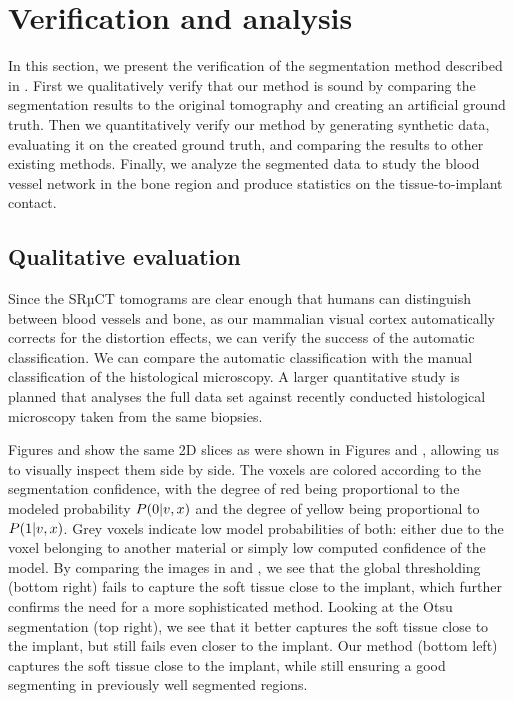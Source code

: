 \section{Verification and analysis}
\label{sec:verification}

In this section, we present the verification of the segmentation method
described in . First we qualitatively verify that our method
is sound by comparing the segmentation results to the original tomography and
creating an artificial ground truth. Then we quantitatively verify our method
by generating synthetic data, evaluating it on the created ground truth, and
comparing the results to other existing methods. Finally, we analyze the
segmented data to study the blood vessel network in the bone region and produce
statistics on the tissue-to-implant contact.

\subsection{Qualitative evaluation}

Since the SRµCT tomograms are clear enough that humans can distinguish between
blood vessels and bone, as our mammalian visual cortex automatically corrects
for the distortion effects, we can verify the success of the automatic
classification. We can compare the automatic classification with the manual
classification of the histological microscopy. A larger quantitative study is
planned that analyses the full data set against recently conducted histological
microscopy taken from the same biopsies.

Figures  and 
show the same 2D slices as were shown in Figures  and
, allowing us to visually inspect them side by side. The
voxels are colored according to the segmentation confidence, with the degree of
red being proportional to the modeled probability $P\!\left(0\middle\vert v,x\right)$ and the
degree of yellow being proportional to $P\!\left(1\middle\vert v,x\right)$. Grey voxels indicate
low model probabilities of both: either due to the voxel belonging to another
material or simply low computed confidence of the model.  By comparing the
images in  and
, we see that the global thresholding (bottom
right) fails to capture the soft tissue close to the implant, which further
confirms the need for a more sophisticated method. Looking at the Otsu
segmentation (top right), we see that it better captures the soft tissue close
to the implant, but still fails even closer to the implant. Our method (bottom
left) captures the soft tissue close to the implant, while still ensuring a
good segmenting in previously well segmented regions.

